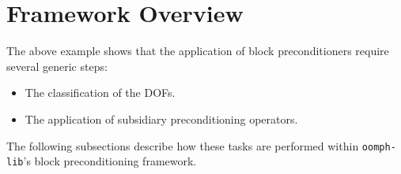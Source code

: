 \section{ Framework Overview\label{sec:framework_overview}}
The above example shows that the application of block preconditioners
require several generic steps:
\begin{itemize}
\item The classification of the DOFs.
\item The application of subsidiary preconditioning operators.
\end{itemize}
The following subsections describe how these tasks are performed
within \texttt{oomph-lib}'s block preconditioning framework.

